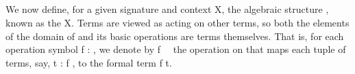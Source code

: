 \begin{code}
\AgdaSymbol{)}\AgdaSpace{}%
\AgdaSymbol{=}\AgdaSpace{}%
\AgdaSpace{}%
\AgdaSymbol{(}\AgdaSpace{}%
\AgdaSpace{}%
\AgdaSymbol{)}\<%
\\
%
\>[1]\AgdaSpace{}%
\AgdaSymbol{(}\AgdaSpace{}%
\AgdaSymbol{)}\AgdaSpace{}%
\AgdaSymbol{(}\AgdaSpace{}%
\AgdaSymbol{)}\AgdaSpace{}%
\AgdaSymbol{=}\AgdaSpace{}%
\AgdaSpace{}%
\AgdaSpace{}%
\AgdaSpace{}%
\AgdaSpace{}%
\AgdaSpace{}%
\AgdaSymbol{(}\AgdaSpace{}%
\AgdaSymbol{)}\AgdaSpace{}%
\AgdaSymbol{(}\AgdaSpace{}%
\AgdaSymbol{))}\<%
\\
%
\\[\AgdaEmptyExtraSkip]%
%
\>[1]%
\>[12]\AgdaSymbol{:}\AgdaSpace{}%
%
\>[29]\<%
\\
%
\>[1]\AgdaSpace{}%
\AgdaSymbol{=}\AgdaSpace{}%
\AgdaSpace{}%
\AgdaSymbol{\{}\AgdaSpace{}%
\AgdaSpace{}%
\AgdaSymbol{=}\AgdaSpace{}%
\AgdaSpace{}%
\AgdaSymbol{;}\AgdaSpace{}%
\AgdaSpace{}%
\AgdaSymbol{=}\AgdaSpace{}%
\AgdaSpace{}%
\AgdaSymbol{;}\AgdaSpace{}%
\AgdaSpace{}%
\AgdaSymbol{=}\AgdaSpace{}%
\AgdaSpace{}%
\AgdaSymbol{\}}\<%
\end{code}
\fi

We now define, for a given signature  and context \ab X,
the algebraic structure , known as the    \ab
X.  Terms are viewed as acting on other terms, so both the elements of the domain of 
and its basic operations are terms themselves. That is, for each operation symbol \ab
f : , we denote by \ab f~~ the operation on  that maps
each tuple of terms, say, \ab t :  \ab f  , to the formal
term \ab f \ab t.

